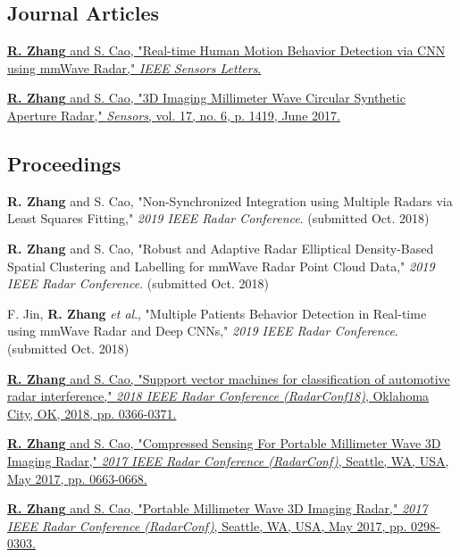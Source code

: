 \documentclass[letterpaper,9pt]{article}
\newcommand{\etal}{\textit{et al}.}
\renewenvironment{itemize}{
  \begin{list}{}{
    \setlength{\topsep}{0pt}
    \setlength{\itemsep}{0pt}
    \setlength{\parsep}{0pt}
    \setlength{\partopsep}{0pt}
    \setlength{\leftmargin}{1.5em}
  }
}{\end{list}}
\begin{document}
\subsection*{Journal Articles}

\begin{itemize}
  \item \href{https://ieeexplore.ieee.org/document/8585077}{{\bf R. Zhang} and S. Cao, "Real-time Human Motion Behavior Detection via CNN using mmWave Radar," {\it IEEE Sensors Letters}.}
  \item \href{http://www.mdpi.com/1424-8220/17/6/1419}{{\bf R. Zhang} and S. Cao, "3D Imaging Millimeter Wave Circular Synthetic Aperture Radar," {\it Sensors}, vol. 17, no. 6, p. 1419, June 2017.}
\end{itemize}

\subsection*{Proceedings}

\begin{itemize}
  \item {\bf R. Zhang} and S. Cao, "Non-Synchronized Integration using Multiple Radars via Least Squares Fitting," {\it 2019 IEEE Radar Conference}. (submitted Oct. 2018)
  \item {\bf R. Zhang} and S. Cao, "Robust and Adaptive Radar Elliptical Density-Based Spatial Clustering and Labelling for mmWave Radar Point Cloud Data," {\it 2019 IEEE Radar Conference}. (submitted Oct. 2018)
  \item F. Jin, {\bf R. Zhang} \etal, "Multiple Patients Behavior Detection in Real-time using mmWave Radar and Deep CNNs," {\it 2019 IEEE Radar Conference}. (submitted Oct. 2018)
  \item \href{https://ieeexplore.ieee.org/abstract/document/8378586/}{{\bf R. Zhang} and S. Cao, "Support vector machines for classification of automotive radar interference," {\it 2018 IEEE Radar Conference (RadarConf18)}, Oklahoma City, OK, 2018, pp. 0366-0371.}
  \item \href{http://ieeexplore.ieee.org/document/7944286/}{{\bf R. Zhang} and S. Cao, "Compressed Sensing For Portable Millimeter Wave 3D Imaging Radar," {\it 2017 IEEE Radar Conference (RadarConf)}, Seattle, WA, USA, May 2017, pp. 0663-0668.}
  \item \href{http://ieeexplore.ieee.org/abstract/document/7944216/}{{\bf R. Zhang} and S. Cao, "Portable Millimeter Wave 3D Imaging Radar," {\it 2017 IEEE Radar Conference (RadarConf)}, Seattle, WA, USA, May 2017, pp. 0298-0303.}
\end{itemize}
\end{document}
